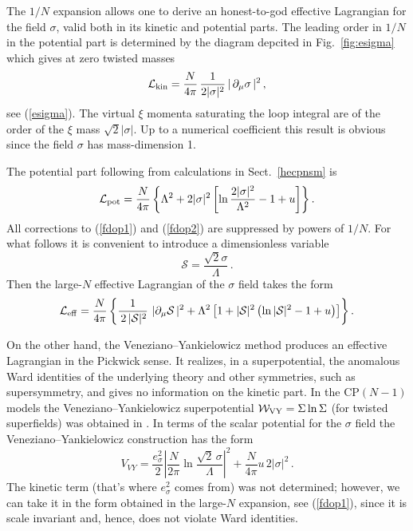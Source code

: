 \documentclass[epsfig,12pt]{article}
\def\beq{\begin{equation}}
\def\eeq{\end{equation}}
\newcommand{\cs}{{\mathcal S}}
\def\beq{\begin{equation}}
\def\eeq{\end{equation}}
\begin{document}
{The $1/N$ expansion allows one to derive an honest-to-god effective
Lagrangian for the field $\sigma$, valid both in its kinetic and potential parts. The  leading order in
$1/N$ in the potential part is determined by the diagram depcited in Fig.~\ref{fig:esigma}
which gives at zero twisted masses
\beq
{\mathcal L}_{\rm kin} =\frac{N}{4\pi}\,\frac{1}{2|\sigma|^2}\,| \,  \partial_\mu\sigma \,|^2
\,,
\label{fdop1}
\eeq
see (\ref{esigma}).
The  virtual $\xi$ momenta saturating the loop integral are of the order of the $\xi$
mass $\sqrt{2}|\sigma|$. Up to a numerical coefficient this result is obvious since the field
$\sigma$ has mass-dimension 1.

The potential part following from calculations in Sect.~\ref{hecpnsm}
is 
\beq
{\mathcal L}_{\rm pot} = \frac{N}{4\pi}\left\{\Lambda^2 +2|\sigma|^2\left[
\ln\frac{2|\sigma|^2}{\Lambda^2}-1+u\right]
\right\}.
\label{fdop2}
\eeq
All corrections to (\ref{fdop1}) and  (\ref{fdop2}) are suppressed by powers
of $1/N$. For what follows it is convenient to introduce a dimensionless variable
\beq
\cs = \frac{ \sqrt{2}\sigma}{\Lambda}\,.
\eeq
Then the large-$N$ effective Lagrangian of the $\sigma$ field takes the form
\beq
{\mathcal L}_{\rm eff} =\frac{N}{4\pi}
\left\{
\frac{1}{\,2\, |\cs|^2}\,\,
 | \partial_\mu\cs \, |^2
+\Lambda^2
\left[1 +|\cs |^2\left( \ln |\cs|^2 -1+u\right)\right]
\right\}.
\label{fdop3}
\eeq

On the other hand, 
the Veneziano--Yankielowicz method \cite{VYan} produces 
an effective Lagrangian in the Pickwick sense. It realizes, in a superpotential,  the  anomalous Ward identities of the 
underlying theory
and other symmetries, such as supersymmetry, and gives no information on the kinetic
part. In the CP$(N-1)$ models
the Veneziano--Yankielowicz superpotential ${\mathcal W}_{\rm VY} = \Sigma \ln \Sigma $ (for twisted superfields)
was obtained in \cite{AdDVecSal,ChVa,W93}. 
In terms of the scalar potential for the $\sigma$ field
the Veneziano--Yankielowicz  construction has the form
\beq
V_{VY} = \frac{e^2_\sigma}{2} \left|\frac{N}{2\pi}
\ln\frac{\sqrt{2}\, \sigma}{\Lambda}\right|^2
+\frac{N}{4\pi} u\,2|\sigma|^2\,.
\label{fdop4}
\eeq
The kinetic term (that's where $e^2_\sigma$ comes from) was not determined; however, we can take
it in the form obtained in the large-$N$ expansion, see (\ref{fdop1}),
since it is scale invariant and, hence,  does not violate Ward identities.

}
\end{document}
